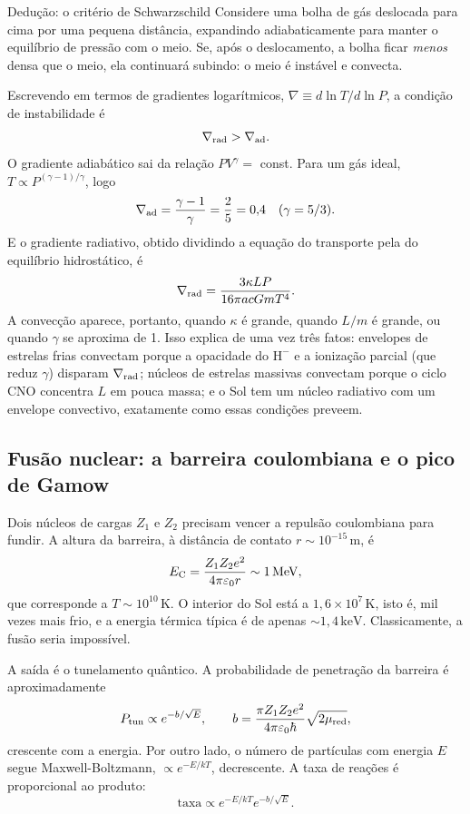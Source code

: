 \documentclass[11pt,a4paper]{article}
\begin{document}
\begin{lessonblock}[borderline west={2pt}{0pt}{astroGold}]{Dedução: o critério de Schwarzschild}
Considere uma bolha de gás deslocada para cima por uma pequena distância, expandindo adiabaticamente para manter o equilíbrio de pressão com o meio. Se, após o deslocamento, a bolha ficar \emph{menos} densa que o meio, ela continuará subindo: o meio é instável e convecta.

Escrevendo em termos de gradientes logarítmicos, $\nabla\equiv d\ln T/d\ln P$, a condição de instabilidade é
\[
\nabla_{\rm rad}>\nabla_{\rm ad}.
\]
O gradiente adiabático sai da relação $PV^{\gamma}=$ const. Para um gás ideal, $T\propto P^{(\gamma-1)/\gamma}$, logo
\[
\nabla_{\rm ad}=\frac{\gamma-1}{\gamma}=\frac{2}{5}=0{,}4
\quad(\gamma=5/3).
\]
E o gradiente radiativo, obtido dividindo a equação do transporte pela do equilíbrio hidrostático, é
\[
\nabla_{\rm rad}=\frac{3\kappa L P}{16\pi acGmT^{4}}.
\]
A convecção aparece, portanto, quando $\kappa$ é grande, quando $L/m$ é grande, ou quando $\gamma$ se aproxima de 1. Isso explica de uma vez três fatos: envelopes de estrelas frias convectam porque a opacidade do $\mathrm{H^-}$ e a ionização parcial (que reduz $\gamma$) disparam $\nabla_{\rm rad}$; núcleos de estrelas massivas convectam porque o ciclo CNO concentra $L$ em pouca massa; e o Sol tem um núcleo radiativo com um envelope convectivo, exatamente como essas condições preveem.
\end{lessonblock}

\subsection*{Fusão nuclear: a barreira coulombiana e o pico de Gamow}

Dois núcleos de cargas $Z_1$ e $Z_2$ precisam vencer a repulsão coulombiana para fundir. A altura da barreira, à distância de contato $r\sim10^{-15}\,\mathrm{m}$, é
\[
E_{\rm C}=\frac{Z_1Z_2e^{2}}{4\pi\varepsilon_0 r}\sim1\,\mathrm{MeV},
\]
que corresponde a $T\sim10^{10}\,\mathrm{K}$. O interior do Sol está a $1{,}6\times10^{7}\,\mathrm{K}$, isto é, mil vezes mais frio, e a energia térmica típica é de apenas $\sim1{,}4\,\mathrm{keV}$. Classicamente, a fusão seria impossível.

A saída é o tunelamento quântico. A probabilidade de penetração da barreira é aproximadamente
\[
P_{\rm tun}\propto e^{-b/\sqrt{E}},\qquad
b=\frac{\pi Z_1Z_2e^{2}}{4\pi\varepsilon_0\hbar}\sqrt{2\mu_{\rm red}},
\]
crescente com a energia. Por outro lado, o número de partículas com energia $E$ segue Maxwell-Boltzmann, $\propto e^{-E/kT}$, decrescente. A taxa de reações é proporcional ao produto:
\[
\text{taxa}\propto e^{-E/kT}e^{-b/\sqrt{E}}.
\]
\end{document}
